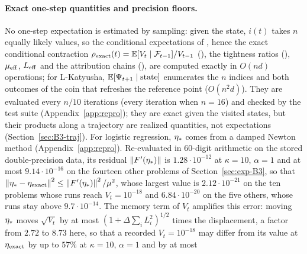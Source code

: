 \paragraph{Exact one-step quantities and precision floors.}
No one-step expectation is estimated by sampling: given the state, $i(t)$ takes $n$ equally likely values, so the
conditional expectations of , hence the exact conditional contraction
$\rho_{\rm exact}(t)=\mathbb{E}[V_t\mid\mathcal F_{t-1}]/V_{t-1}$ (), the tightness ratios
(), $\mu_{\mathrm{eff}}$, $L_{\mathrm{eff}}$ and the
attribution chains (), are computed exactly in $O(nd)$ operations; for L-Katyusha,
$\mathbb{E}[\Psi_{t+1}\mid\text{state}]$ enumerates the $n$ indices and both outcomes of the coin that refreshes the reference
point ($O(n^2d)$). They are evaluated every $n/10$ iterations (every iteration when $n=16$) and checked by the test
suite (Appendix~\ref{app:repro}); they are exact given the visited states, but their products along a trajectory are
realized quantities, not expectations (Section~\ref{sec:B3-traj}).
For logistic regression, $\eta_\ast$ comes from a damped Newton method (Appendix~\ref{app:repro}). Re-evaluated in
60-digit arithmetic on the stored double-precision data, its residual $\left\|F'(\eta_\ast)\right\|$ is $1.28\cdot10^{-12}$ at
$\kappa=10$, $\alpha=1$ and at most $9.14\cdot10^{-16}$ on the fourteen other problems of Section~\ref{sec:exp-B3}, so
that $\left\|\eta_\ast-\eta_{\rm exact}\right\|^2\le\left\|F'(\eta_\ast)\right\|^2/\mu^2$, whose largest value is $2.12\cdot10^{-21}$ on
the ten problems whose runs reach $V_t=10^{-18}$ and $6.84\cdot10^{-20}$ on the five others, whose runs stay above
$9.7\cdot10^{-14}$. The memory term of $V_t$ amplifies this error: moving $\eta_\ast$ moves $\sqrt{V_t}$ by at most
$(1+\Delta\sum_iL_i^2)^{1/2}$ times the displacement, a factor from $2.72$ to $8.73$ here, so that a recorded
$V_t=10^{-18}$ may differ from its value at $\eta_{\rm exact}$ by up to $57\%$ at $\kappa=10$, $\alpha=1$ and by at most
